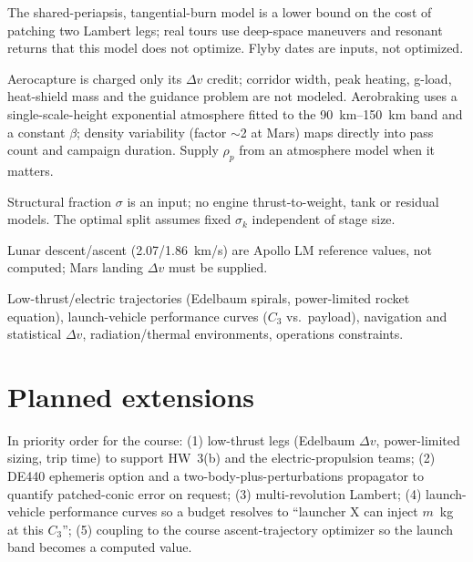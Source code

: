 \documentclass[11pt,a4paper]{article}
\newcommand{\dv}{\Delta v}
\begin{document}
\begin{description}[style=nextline,leftmargin=0pt,itemsep=4pt]
\item[Powered-flyby idealization.] The shared-periapsis, tangential-burn model is a
  lower bound on the cost of patching two Lambert legs; real tours use deep-space maneuvers
  and resonant returns that this model does not optimize. Flyby dates are inputs, not
  optimized.
\item[Aero-assist.] Aerocapture is charged only its $\dv$ credit; corridor width, peak heating,
  g-load, heat-shield mass and the guidance problem are not modeled. Aerobraking uses a
  single-scale-height exponential atmosphere fitted to the \SIrange{90}{150}{km} band and a
  constant $\beta$; density variability (factor $\sim$2 at Mars) maps directly into pass
  count and campaign duration. Supply $\rho_p$ from an atmosphere model when it matters.
\item[Staging model.] Structural fraction $\sigma$ is an input; no engine thrust-to-weight,
  tank or residual models. The optimal split assumes fixed $\sigma_k$ independent of stage
  size.
\item[Reference values in budgets.] Lunar descent/ascent (2.07/1.86~km/s) are Apollo LM
  reference values, not computed; Mars landing $\dv$ must be supplied.
\item[Not covered.] Low-thrust/electric trajectories (Edelbaum spirals, power-limited rocket
  equation), launch-vehicle performance curves ($C_3$ vs.\ payload), navigation and
  statistical $\dv$, radiation/thermal environments, operations constraints.
\end{description}

\section{Planned extensions}
In priority order for the course: (1) low-thrust legs (Edelbaum $\dv$, power-limited sizing,
trip time) to support HW~3(b) and the electric-propulsion teams; (2) DE440 ephemeris option
and a two-body-plus-perturbations propagator to quantify patched-conic error on request;
(3) multi-revolution Lambert; (4) launch-vehicle performance curves so a budget resolves to
``launcher X can inject $m$~kg at this $C_3$''; (5) coupling to the course ascent-trajectory
optimizer so the launch band becomes a computed value.

\appendix
\end{document}
